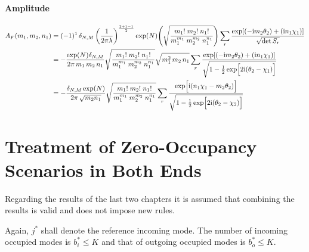 \documentclass[
	english,
	a4paper,
	fontsize=10pt,
	parskip=half,
	titlepage=true,
	DIV=12,
	final
]{scrreprt}
\newcommand*{\iunit}{\ensuremath{\mathrm{i}}}
\begin{document}
\subsubsection{Amplitude}
\begin{align}
	A_F(m_1, m_2, n_1)
&=
	(-1)^1 \, \delta_{N,M} \, \qty(
		\frac{1}{2\pi\lambda}
	)^{\frac{2 + 1 - 1}{2}}
	\exp(N)
	\qty(
		\sqrt{\frac
			{ m_1!      \; m_2!     \; n_1! }
			{ m_1^{m_1} \;m_2^{m_2} \; n_1^{n_1} }
	})
	\sum_r
		\frac
		{\exp[
			\qty(- \iunit m_2 \theta_2) + 
			\qty(  \iunit n_1 \chi  _1)
		]}
		{\sqrt{\det S_r}}
	\\
&=
\nonumber
	-\frac
		{\exp(N) \delta_{N,M}}
		{2\pi \, m_1 \, m_2 \, n_1}
	\sqrt{\frac
		{ m_1!      \; m_2!     \; n_1! }
		{ m_1^{m_1} \;m_2^{m_2} \; n_1^{n_1} }
	}
	\sqrt{m_1^2 \, m_2 \, n_1}
	\sum_r
		\frac
		{\exp[
			\qty(- \iunit m_2 \theta_2) + 
			\qty(  \iunit n_1 \chi  _1)
		]}
		{\sqrt{1 - \frac{1}{2} \exp[\Big. 2\iunit (\theta_2 - \chi_1)]}}
	\\
&=
	-\frac
		{\delta_{N,M} \exp(N)}
		{2\pi \, \sqrt{m_2 n_1}}
	\sqrt{\frac
		{ m_1!      \; m_2!     \; n_1! }
		{ m_1^{m_1} \;m_2^{m_2} \; n_1^{n_1} }
	}
	\sum_r \frac
		{\exp[ \Big. \iunit
			\qty( n_1 \chi_1 - m_2 \theta_2 )
		]}
		{\sqrt{1 - \frac{1}{2} \exp[\Big. 2\iunit (\theta_2 - \chi_2)]}}
\end{align}

\chapter{Treatment of Zero-Occupancy Scenarios in Both Ends}
Regarding the results of the last two chapters it is assumed that combining the results is valid and does not impose new rules.

Again, $j^*$ shall denote the reference incoming mode. The number of incoming occupied modes is 
$b_i^* \leq K$ and that of outgoing occupied modes is $b_o^* \leq K$.
\end{document}
